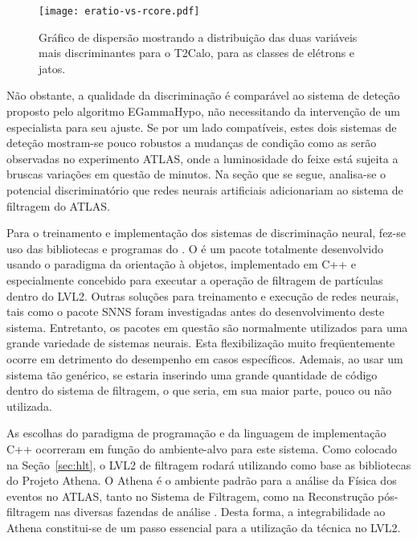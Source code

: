 \begin{figure}
\begin{center}
\texttt{[image: eratio-vs-rcore.pdf]}
\end{center}
\caption{Gráfico de dispersão mostrando a distribuição das duas variáveis mais
discriminantes para o T2Calo, para as classes de elétrons e jatos.}
\label{fig:eratio-vs-rcore}
\end{figure}

Não obstante, a qualidade da discriminação é comparável ao sistema de deteção
proposto pelo algoritmo EGammaHypo, não necessitando da intervenção de um
especialista para seu ajuste. Se por um lado compatíveis, estes dois sistemas
de deteção mostram-se pouco robustos a mudanças de condição como as serão
observadas no experimento ATLAS, onde a luminosidade do feixe está sujeita a
bruscas variações em questão de minutos. Na seção que se segue, analisa-se o
potencial discriminatório que redes neurais artificiais adicionariam ao
sistema de filtragem do ATLAS.

Para o treinamento e implementação dos sistemas de discriminação neural, fez-se
uso das bibliotecas e programas do . O  é
um pacote totalmente desenvolvido usando o paradigma da orientação à objetos,
implementado em C++ \cite{stroustrup} e especialmente concebido para executar
a operação de filtragem de partículas dentro do LVL2. Outras soluções para
treinamento e execução de redes neurais, tais como o pacote SNNS \cite{snns}
foram investigadas antes do desenvolvimento deste sistema. Entretanto, os
pacotes em questão são normalmente utilizados para uma grande variedade de
sistemas neurais. Esta flexibilização muito freqüentemente ocorre em
detrimento do desempenho em casos específicos. Ademais, ao usar um sistema tão
genérico, se estaria inserindo uma grande quantidade de código dentro do
sistema de filtragem, o que seria, em sua maior parte, pouco ou não utilizada.

As escolhas do paradigma de programação e da linguagem de implementação C++
ocorreram em função do ambiente-alvo para este sistema. Como colocado na
Seção~\ref{sec:hlt}, o LVL2 de filtragem rodará utilizando como base as
bibliotecas do Projeto Athena. O Athena é o ambiente padrão para a análise da
Física dos eventos no ATLAS, tanto no Sistema de Filtragem, como na
Reconstrução pós-filtragem nas diversas fazendas de análise
. Desta forma, a integrabilidade ao Athena constitui-se de um
passo essencial para a utilização da técnica no LVL2. 

